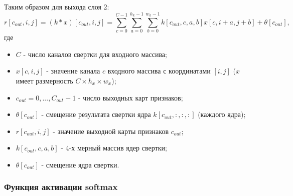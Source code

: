 \documentclass[12pt]{article}
\begin{document}
\begin{sloppypar}
Таким образом для выхода слоя 2:
\begin{equation}
    \label{ch1:eqn:conv_3d_4d}
    r[c_{out}, i,j] = (k\ast x)[c_{out},i,j] = \sum_{c=0}^{C-1}\sum_{a=0}^{h_k-1}\sum_{b=0}^{w_k-1}k[c_{out}, c, a,b]x[c,i+a,j+b] + \theta[c_{out}],
\end{equation}
где 
\begin{itemize}
\itemsep 0em 
    \item $C$ - число каналов свертки для входного массива; 
    \item $x[c, i,j]$ - значение канала $c$ входного массива с координатами $[i,j]$ ($x$ имеет размерность $C\times h_x \times w_x$);
    \item $c_{out} = 0,...,C_{out}-1$ - число выходных карт признаков;
    \item $\theta[c_{out}]$ - смещение результата свертки ядра $k[c_{out},:,:,:]$ (каждого ядра);
    \item $r[c_{out}, i,j]$ - значение выходной карты признаков $c_{out}$;
    \item $k[c_{out}, c, a,b]$ - 4-х мерный массив ядер свертки;
    \item $\theta[c_{out}]$ - смещение ядра свертки.
\end{itemize}

\subsubsection{Функция активации softmax}


\end{sloppypar}
\end{document}
